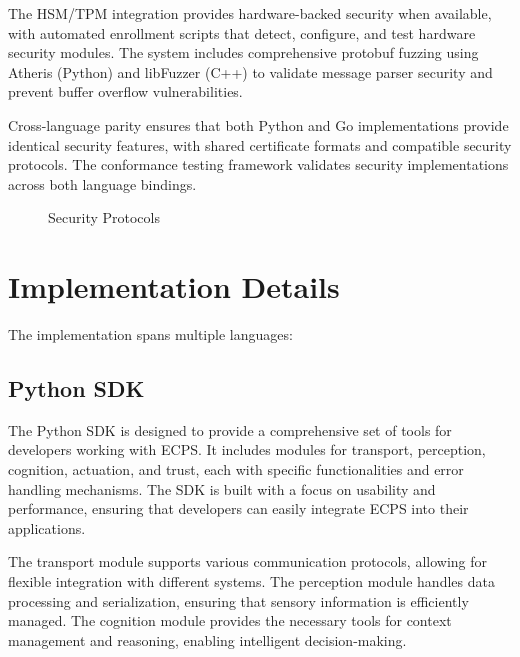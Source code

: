 \documentclass[12pt]{article}
\begin{document}
The HSM/TPM integration provides hardware-backed security when available, with automated enrollment scripts that detect, configure, and test hardware security modules. The system includes comprehensive protobuf fuzzing using Atheris (Python) and libFuzzer (C++) to validate message parser security and prevent buffer overflow vulnerabilities.

Cross-language parity ensures that both Python and Go implementations provide identical security features, with shared certificate formats and compatible security protocols. The conformance testing framework validates security implementations across both language bindings.

\begin{figure}[H]
\centering
{}
\caption{Security Protocols}
\end{figure}

\section{Implementation Details}
The implementation spans multiple languages:

\subsection{Python SDK}
The Python SDK is designed to provide a comprehensive set of tools for developers working with ECPS. It includes modules for transport, perception, cognition, actuation, and trust, each with specific functionalities and error handling mechanisms. The SDK is built with a focus on usability and performance, ensuring that developers can easily integrate ECPS into their applications.

The transport module supports various communication protocols, allowing for flexible integration with different systems. The perception module handles data processing and serialization, ensuring that sensory information is efficiently managed. The cognition module provides the necessary tools for context management and reasoning, enabling intelligent decision-making.
\end{document}
